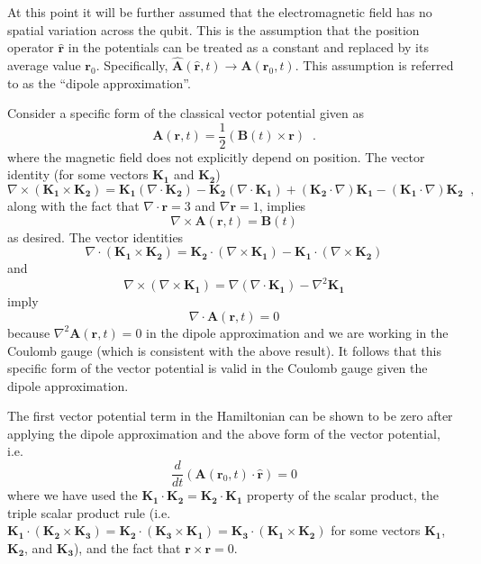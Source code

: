At this point it will be further assumed that the electromagnetic field has no spatial variation across the qubit.  This is the assumption that the position operator $\hat{\mathbf{r}}$ in the potentials can be treated as a constant and replaced by its average value $\mathbf{r}_0$.  Specifically, $\hat{\mathbf{A}}\left(\hat{\mathbf{r}},t\right)\rightarrow \mathbf{A}\left(\mathbf{r}_0,t\right)$.  This assumption is referred to as the ``dipole approximation''.

Consider a specific form of the classical vector potential given as
$$
\mathbf{A}(\mathbf{r},t)=\frac{1}{2}\left(\mathbf{B}(t)\times\mathbf{r}\right)\;\;.
$$
where the magnetic field does not explicitly depend on position.  The vector identity (for some vectors $\mathbf{K_1}$ and $\mathbf{K_2}$)
$$
\nabla\times\left(\mathbf{K_1}\times\mathbf{K_2}\right) = \mathbf{K_1}\left(\nabla\cdot\mathbf{K_2}\right)-\mathbf{K_2}\left(\nabla\cdot\mathbf{K_1}\right)+\left(\mathbf{K_2}\cdot\nabla\right)\mathbf{K_1}-\left(\mathbf{K_1}\cdot\nabla\right)\mathbf{K_2}\;\;,
$$
along with the fact that $\nabla\cdot\mathbf{r}=3$ and $\nabla\mathbf{r}=1$, implies
$$
\nabla\times\mathbf{A}(\mathbf{r},t) = \mathbf{B}(t)
$$
as desired.  The vector identities
$$
\nabla\cdot\left(\mathbf{K_1}\times\mathbf{K_2}\right) = \mathbf{K_2}\cdot\left(\nabla\times\mathbf{K_1}\right)-\mathbf{K_1}\cdot\left(\nabla\times\mathbf{K_2}\right)
$$
and
$$
\nabla\times\left(\nabla\times\mathbf{K_1}\right) = \nabla\left(\nabla\cdot\mathbf{K_1}\right)-\nabla^2\mathbf{K_1}
$$
imply
$$
\nabla\cdot\mathbf{A}(\mathbf{r},t) = 0
$$
because $\nabla^2\mathbf{A}(\mathbf{r},t)=0$ in the dipole approximation and we are working in the Coulomb gauge (which is consistent with the above result).  It follows that this specific form of the vector potential is valid in the Coulomb gauge given the dipole approximation.

The first vector potential term in the Hamiltonian can be shown to be zero after applying the dipole approximation and the above form of the vector potential, i.e.\
$$
\frac{d}{dt}\left(\mathbf{A}(\mathbf{r}_0,t)\cdot\hat{\mathbf{r}}\right) = 0
$$
where we have used the $\mathbf{K_1}\cdot\mathbf{K_2}=\mathbf{K_2}\cdot\mathbf{K_1}$ property of the scalar product, the triple scalar product rule (i.e.\ $\mathbf{K_1}\cdot\left(\mathbf{K_2}\times\mathbf{K_3}\right)=\mathbf{K_2}\cdot\left(\mathbf{K_3}\times\mathbf{K_1}\right)=\mathbf{K_3}\cdot\left(\mathbf{K_1}\times\mathbf{K_2}\right)$ for some vectors $\mathbf{K_1}$, $\mathbf{K_2}$, and $\mathbf{K_3}$), and the fact that $\mathbf{r}\times\mathbf{r}=0$.

